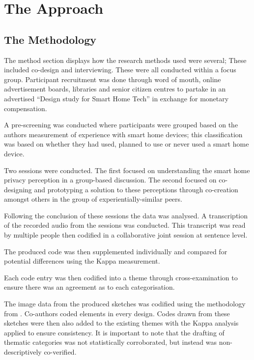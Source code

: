 \section{The Approach}

\subsection{The Methodology}

The method section displays how the research methods used were several; These included co-design and interviewing. These were all conducted within a focus group. Participant recruitment was done through word of mouth, online advertisement boards, libraries and senior citizen centres to partake in an advertised ``Design study for Smart Home Tech'' in exchange for monetary compensation. 

A pre-screening was conducted where participants were grouped based on the authors measurement of experience with smart home devices; this classification was based on whether they had used, planned to use or never used a smart home device.

Two sessions were conducted. The first focused on understanding the smart home privacy perception in a group-based discussion. The second focused on co-designing and prototyping a solution to these perceptions through co-creation amongst others in the group of experientially-similar peers. 

Following the conclusion of these sessions the data was analysed. A transcription of the recorded audio from the sessions was conducted. This transcript was read by multiple people then codified in a collaborative joint session at sentence level. 

The produced code was then supplemented individually and compared for potential differences using the Kappa measurement. 

Each code entry was then codified into a theme through cross-examination to ensure there was an agreement as to each categorisation.

The image data from the produced sketches was codified using the methodology from \cite{Poole:2008:RIU:1409635.1409662}. Co-authors coded elements in every design. 
Codes drawn from these sketches were then also added to the existing themes with the Kappa analysis applied to ensure consistency. It is important to note that the drafting of thematic categories was not statistically corroborated, but instead was non-descriptively co-verified.

